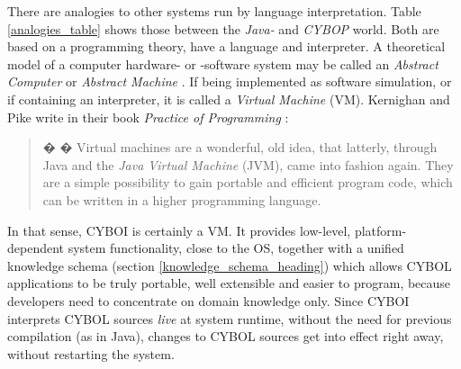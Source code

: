 There are analogies to other systems run by language interpretation. Table
\ref{analogies_table} shows those between the \emph{Java-} and \emph{CYBOP}
world. Both are based on a programming theory, have a language and interpreter.
A theoretical model of a computer hardware- or -software system may be called
an \emph{Abstract Computer} or \emph{Abstract Machine} \cite{wikipedia}. If
being implemented as software simulation, or if containing an interpreter, it
is called a \emph{Virtual Machine} (VM). Kernighan and Pike write in their book
\emph{Practice of Programming} \cite{kernighan1999}:

\begin{quote}
� � Virtual machines are a wonderful, old idea, that latterly, through Java and
    the \emph{Java Virtual Machine} (JVM), came into fashion again. They are a
    simple possibility to gain portable and efficient program code, which can
    be written in a higher programming language.
\end{quote}

In that sense, CYBOI is certainly a VM. It provides low-level, platform-dependent
system functionality, close to the OS, together with a unified knowledge schema
(section \ref{knowledge_schema_heading}) which allows CYBOL applications to be
truly portable, well extensible and easier to program, because developers need
to concentrate on domain knowledge only. Since CYBOI interprets CYBOL sources
\emph{live} at system runtime, without the need for previous compilation (as in
Java), changes to CYBOL sources get into effect right away, without restarting
the system.
